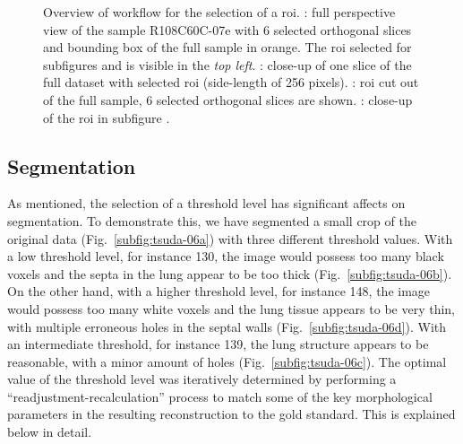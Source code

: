 \begin{figure}[h]
{		\label{subfig:tsuda-05d}%
	}%
	\caption[Overview of workflow for the selection of a region of interest]{Overview of workflow for the selection of a \acf{roi}. : full perspective view of the sample R108C60C-07e with 6 selected orthogonal slices and
bounding box of the full sample in orange. The \ac{roi} selected for subfigures  and  is visible in the \textit{top left}. : close-up of one slice of the full dataset with selected \ac{roi} (side-length of 256 pixels). : \ac{roi} cut out of the full sample, 6 selected orthogonal slices are shown. : close-up of the \ac{roi} in subfigure .}
	\label{fig:tsuda-05}
\end{figure}

\subsection{Segmentation}
As mentioned, the selection of a threshold level has significant affects on segmentation. To demonstrate this, we have segmented a small crop of the original data (Fig.~\ref{subfig:tsuda-06a}) with three different threshold values. With a low threshold level, for instance 130, the image would possess too many black voxels and the septa in the lung appear to be too thick (Fig.~\ref{subfig:tsuda-06b}). On the other hand, with a higher threshold level, for instance 148, the image would possess too many white voxels and the lung tissue appears to be very thin, with multiple erroneous holes in the septal walls (Fig.~\ref{subfig:tsuda-06d}). With an intermediate threshold, for instance 139, the lung structure appears to be reasonable, with a minor amount of holes (Fig.~\ref{subfig:tsuda-06c}). The optimal value of the threshold level was iteratively determined by performing a ``readjustment-recalculation'' process to match some of the key morphological parameters in the resulting \threed reconstruction to the gold standard. This is explained below in detail.

